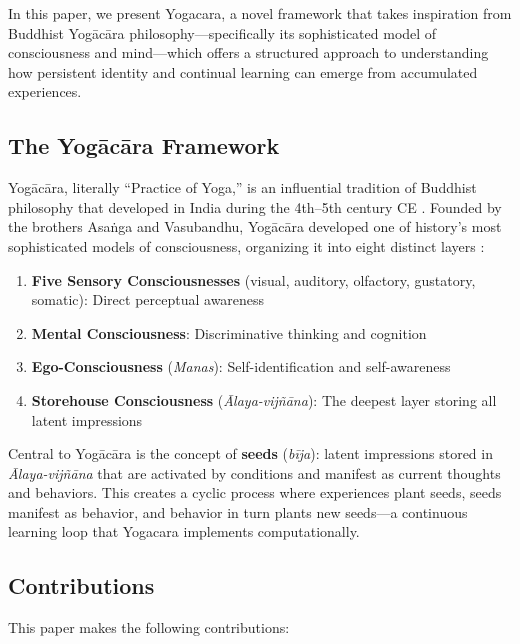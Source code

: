 \documentclass[11pt, a4paper]{article}
\begin{document}
In this paper, we present Yogacara, a novel framework that takes inspiration from Buddhist Yogācāra philosophy---specifically its sophisticated model of consciousness and mind---which offers a structured approach to understanding how persistent identity and continual learning can emerge from accumulated experiences.

\subsection{The Yogācāra Framework}

Yogācāra, literally ``Practice of Yoga,'' is an influential tradition of Buddhist philosophy that developed in India during the 4th--5th century CE \cite{SEP2024}. Founded by the brothers Asaṅga and Vasubandhu, Yogācāra developed one of history's most sophisticated models of consciousness, organizing it into eight distinct layers \cite{Wikipedia2025}:

\begin{enumerate}
    \item \textbf{Five Sensory Consciousnesses} (visual, auditory, olfactory, gustatory, somatic): Direct perceptual awareness
    \item \textbf{Mental Consciousness}: Discriminative thinking and cognition
    \item \textbf{Ego-Consciousness} (\textit{Manas}): Self-identification and self-awareness
    \item \textbf{Storehouse Consciousness} (\textit{Ālaya-vijñāna}): The deepest layer storing all latent impressions
\end{enumerate}

Central to Yogācāra is the concept of \textbf{seeds} (\textit{bīja}): latent impressions stored in \textit{Ālaya-vijñāna} that are activated by conditions and manifest as current thoughts and behaviors. This creates a cyclic process where experiences plant seeds, seeds manifest as behavior, and behavior in turn plants new seeds---a continuous learning loop that Yogacara implements computationally.

\subsection{Contributions}

This paper makes the following contributions:
\end{document}

